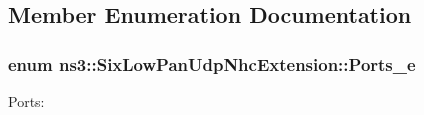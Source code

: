 \subsection{Member Enumeration Documentation}
\subsubsection[{\texorpdfstring{Ports\+\_\+e}{Ports_e}}]{\setlength{\rightskip}{0pt plus 5cm}enum {\bf ns3\+::\+Six\+Low\+Pan\+Udp\+Nhc\+Extension\+::\+Ports\+\_\+e}}\hypertarget{classns3_1_1SixLowPanUdpNhcExtension_a77005f9c06de72b1a6ea105a23bf413b}{}\label{classns3_1_1SixLowPanUdpNhcExtension_a77005f9c06de72b1a6ea105a23bf413b}


Ports\+: 

